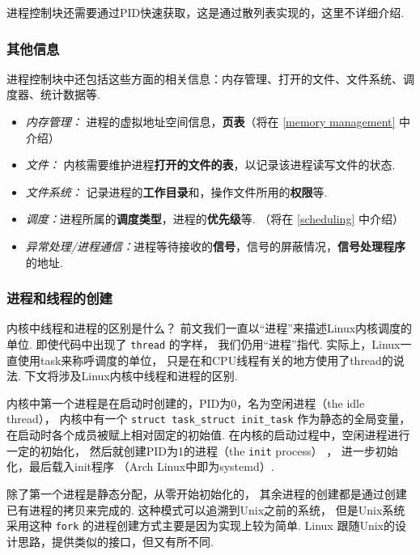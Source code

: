 进程控制块还需要通过PID快速获取，这是通过散列表实现的，这里不详细介绍.

\subsubsection{其他信息}
进程控制块中还包括这些方面的相关信息：内存管理、打开的文件、文件系统、调度器、统计数据等.

\begin{itemize}
	\item\textit{内存管理：} 进程的虚拟地址空间信息，\textbf{页表}（将在 \ref{memory management} 中介绍）
	\item \textit{文件：} 内核需要维护进程\textbf{打开的文件的表}，以记录该进程读写文件的状态.
	\item \textit{文件系统：} 记录进程的\textbf{工作目录}和，操作文件所用的\textbf{权限}等.
	\item \textit{调度：}进程所属的\textbf{调度类型}，进程的\textbf{优先级}等.
	      （将在 \ref{scheduling} 中介绍）
	\item \textit{异常处理/进程通信：}进程等待接收的\textbf{信号}，信号的屏蔽情况，\textbf{信号处理程序}的地址.
\end{itemize}

\subsubsection{进程和线程的创建} \label{creating task}

\begin{qbox}{内核中线程和进程的区别是什么？}
	前文我们一直以“进程”来描述Linux内核调度的单位.
	即使代码中出现了 \lstinline{thread} 的字样，
	我们仍用“进程”指代.
	实际上，Linux一直使用task来称呼调度的单位，
	只是在和CPU线程有关的地方使用了thread的说法.
	下文将涉及Linux内核中线程和进程的区别.
\end{qbox}

内核中第一个进程是在启动时创建的，PID为0，名为空闲进程（the idle thread），
内核中有一个 \lstinline{struct task_struct init_task}
作为静态的全局变量，在启动时各个成员被赋上相对固定的初始值.
在内核的启动过程中，空闲进程进行一定的初始化，
然后就创建PID为1的进程（the \lstinline{init} process）%
，
进一步初始化，最后载入init程序\cite{bovet2005understanding}
（Arch Linux中即为systemd）.

除了第一个进程是静态分配，从零开始初始化的，
其余进程的创建都是通过创建已有进程的拷贝来完成的.
这种模式可以追溯到Unix之前的系统，
但是Unix系统采用这种 \lstinline{fork} 
的进程创建方式主要是因为实现上较为简单.\cite{ritchie1979evolution}
Linux 跟随Unix的设计思路，提供类似的接口，但又有所不同.

